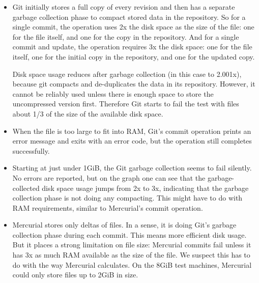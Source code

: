 
\begin{itemize}

    \item Git initially stores a full copy of every revision and then has a
        separate garbage collection phase to compact stored data in the
        repository. So for a single commit, the operation uses 2x the disk space
        as the size of the file: one for the file itself, and one for the copy
        in the repository. And for a single commit and update, the operation
        requires 3x the disk space: one for the file itself, one for the initial
        copy in the repository, and one for the updated copy.

        Disk space usage reduces after garbage collection (in this case to
        2.001x), because git compacts and de-duplicates the data in its
        repository. However, it cannot be reliably used unless there is enough
        space to store the uncompressed version first. Therefore Git starts to
        fail the test with files about 1/3 of the size of the available disk
        space.

    \item When the file is too large to fit into RAM, Git's commit operation
        prints an error message and exits with an error code, but the operation
        still completes successfully.

    \item Starting at just under 1GiB, the Git garbage collection seems to fail
        silently. No errors are reported, but on the graph one can see that the
        garbage-collected disk space usage jumps from 2x to 3x, indicating that
        the garbage collection phase is not doing any compacting. This might
        have to do with RAM requirements, similar to Mercurial's commit
        operation.

    \item Mercurial stores only deltas of files. In a sense, it is doing Git's
        garbage collection phase during each commit. This means more efficient
        disk usage. But it places a strong limitation on file size: Mercurial
        commits fail unless it has 3x as much RAM available as the size of the
        file. We suspect this has to do with the way Mercurial calculates. On
        the 8GiB test machines, Mercurial could only store files up to 2GiB in
        size.

\end{itemize}


